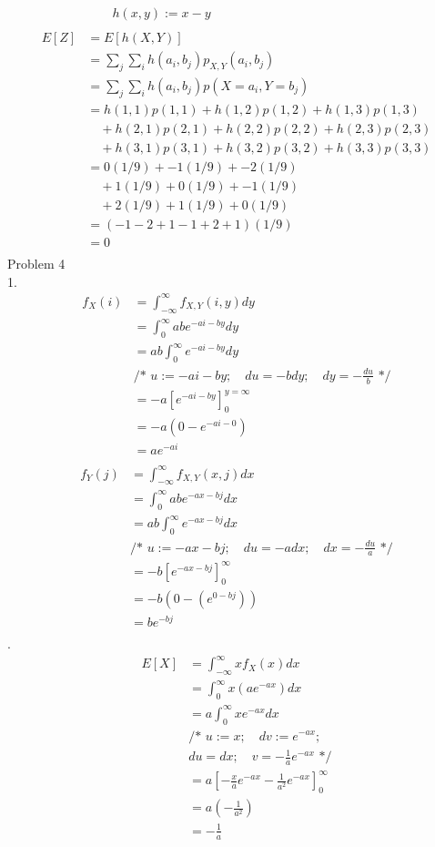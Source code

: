 \documentclass[12pt,border=4pt,multi]{article} %
\begin{document}
\begin{align*}
&\quad\quad h(x, y) := x - y\\
\\
E[Z] &= E[h(X, Y)]\\
&= \sum_j \sum_i h(a_i, b_j) p_{X, Y}(a_i, b_j)\\
&= \sum_j \sum_i h(a_i, b_j) p(X = a_i, Y = b_j)\\
&= h(1,1)p(1,1) + h(1,2)p(1,2) + h(1,3)p(1,3)\\
&\quad+ h(2,1)p(2,1) + h(2,2)p(2,2) + h(2,3)p(2,3)\\
&\quad+ h(3,1)p(3,1) + h(3,2)p(3,2) + h(3,3)p(3,3)\\
&= 0(1/9) + -1(1/9) + -2(1/9)\\
&\quad+ 1(1/9) + 0(1/9) + -1(1/9)\\
&\quad+ 2(1/9) + 1(1/9) + 0(1/9)\\
&= (- 1 - 2 + 1 - 1 + 2 + 1)(1/9)\\
&= \boxed{0}\\
\end{align*}
\newpage
\noindent
Problem 4\\
1.
\begin{align*}
f_X(i) &= \int_{-\infty}^{\infty} f_{X, Y}(i, y) dy\\
&= \int_{0}^{\infty} abe^{-ai - by} dy\\
&= ab\int_{0}^{\infty} e^{-ai - by} dy\\
&\text{/* } u:= -ai - by;\quad du = -bdy;\quad dy = -\frac{du}{b}\text{ */}\\
&= -a\left[e^{-ai - by}\right]_0^{y = \infty}\\
&= -a(0 - e^{-ai - 0})\\
&= \boxed{ae^{-ai}}\\
\end{align*}
\begin{align*}
f_Y(j) &= \int_{-\infty}^{\infty} f_{X, Y}(x, j) dx\\
&= \int_{0}^{\infty} abe^{-ax - bj} dx\\
&= ab\int_{0}^{\infty} e^{-ax - bj} dx\\
&\text{/* } u:= -ax - bj;\quad du = -adx;\quad dx = -\frac{du}{a}\text{ */}\\
&= -b\left[e^{-ax - bj}\right]_0^{\infty}\\
&= -b(0 - (e^{0 - bj}))\\
&= \boxed{be^{-bj}}\\
\end{align*}
\newpage
{}.
\begin{align*}
E[X] &= \int_{-\infty}^{\infty} x f_X(x) dx\\
&= \int_{0}^{\infty} x (ae^{-ax}) dx\\
&= a\int_{0}^{\infty} xe^{-ax} dx\\
&\text{/* } u:= x;\quad dv := e^{-ax};\\
&du = dx;\quad v = -\frac{1}{a}e^{-ax}\text{ */}\\
&= a\left[-\frac{x}{a}e^{-ax} - \frac{1}{a^2}e^{-ax}\right]_0^{\infty}\\
&= a\left(-\frac{1}{a^2}\right)\\
&= \boxed{-\frac{1}{a}}\\
\end{align*}
\end{document}
